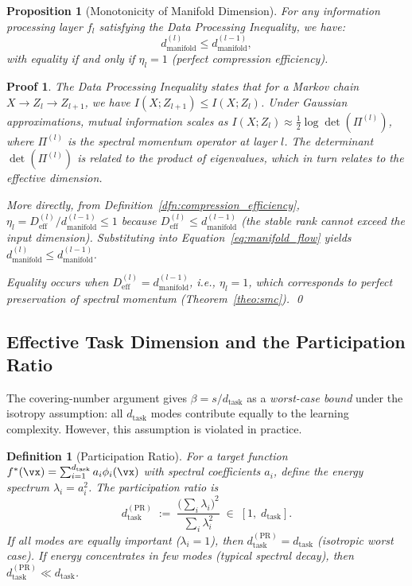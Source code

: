 \documentclass[11pt, a4paper]{article}
\newtheorem{dfn}[theo]{Definition}
\newtheorem{prop}[theo]{Proposition}
\theoremstyle{plain}
\newtheorem*{pf}{Proof}
\begin{document}
\begin{prop}[Monotonicity of Manifold Dimension]\label{prop:monotonicity}
For any information processing layer $f_l$ satisfying the Data Processing Inequality, we have:
\begin{equation}
d_{\text{manifold}}^{(l)} \leq d_{\text{manifold}}^{(l-1)},
\end{equation}
with equality if and only if $\eta_l = 1$ (perfect compression efficiency).
\end{prop}

\begin{pf}
The Data Processing Inequality states that for a Markov chain $X \to Z_l \to Z_{l+1}$, we have $I(X;Z_{l+1}) \leq I(X;Z_l)$. Under Gaussian approximations, mutual information scales as $I(X;Z_l) \approx \frac{1}{2}\log\det(\Pi^{(l)})$, where $\Pi^{(l)}$ is the spectral momentum operator at layer $l$. The determinant $\det(\Pi^{(l)})$ is related to the product of eigenvalues, which in turn relates to the effective dimension.

More directly, from Definition~\ref{dfn:compression_efficiency}, $\eta_l = D_{\text{eff}}^{(l)}/d_{\text{manifold}}^{(l-1)} \leq 1$ because $D_{\text{eff}}^{(l)} \leq d_{\text{manifold}}^{(l-1)}$ (the stable rank cannot exceed the input dimension). Substituting into Equation~\eqref{eq:manifold_flow} yields $d_{\text{manifold}}^{(l)} \leq d_{\text{manifold}}^{(l-1)}$.

Equality occurs when $D_{\text{eff}}^{(l)} = d_{\text{manifold}}^{(l-1)}$, i.e., $\eta_l = 1$, which corresponds to perfect preservation of spectral momentum (Theorem~\ref{theo:smc}).
\qed
\end{pf}



\subsection{Effective Task Dimension and the Participation Ratio}\label{sec:d_task_effective}
\label{dfn:d_task_PR}
The covering-number argument gives $\beta = s/d_{\mathrm{task}}$ as a \emph{worst-case bound} under the isotropy assumption: all $d_{\mathrm{task}}$ modes contribute equally to the learning complexity. However, this assumption is violated in practice.

\begin{dfn}[Participation Ratio]\label{dfn:participation_ratio}
For a target function $f^*(\vx) = \sum_{i=1}^{d_{\mathrm{task}}} a_i \phi_i(\vx)$ with spectral coefficients $a_i$, define the energy spectrum $\lambda_i = a_i^2$. The \emph{participation ratio} is
\begin{equation}
d_{\mathrm{task}}^{\mathrm{(PR)}} \;:=\; \frac{\bigl(\sum_i \lambda_i\bigr)^2}{\sum_i \lambda_i^2}
\;\in\; [1,\; d_{\mathrm{task}}].
\label{eq:d_task_PR}
\end{equation}
If all modes are equally important ($\lambda_i = 1$), then $d_{\mathrm{task}}^{\mathrm{(PR)}} = d_{\mathrm{task}}$ (isotropic worst case). If energy concentrates in few modes (typical spectral decay), then $d_{\mathrm{task}}^{\mathrm{(PR)}} \ll d_{\mathrm{task}}$.
\end{dfn}
\end{document}
